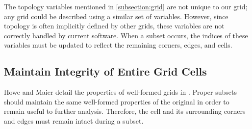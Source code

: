 The topology variables mentioned in \ref{subsection:grid} are not unique to
our grid; any grid could be described using a similar set of variables.
However, since topology is often implicitly defined by other grids, these
variables are not correctly handled by current software.  When a subset
occurs, the indices of these variables must be updated to reflect the
remaining corners, edges, and cells.

\subsection{Maintain Integrity of Entire Grid Cells}

Howe and Maier detail the properties of well-formed grids in \cite{UGRID}.
Proper subsets should maintain the same well-formed properties of the original
in order to remain useful to further analysis.  Therefore, the cell and its
surrounding corners and edges must remain intact during a subset.

